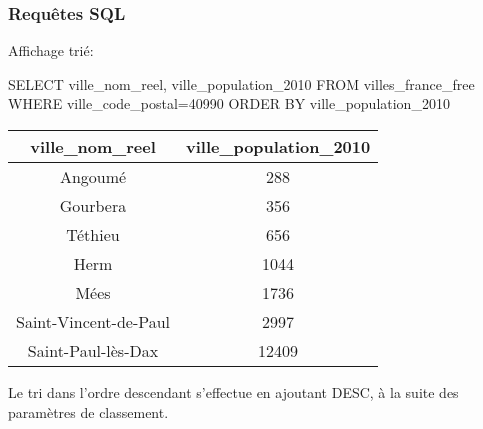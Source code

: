 \begin{frame}[fragile]
\frametitle{Requêtes SQL}

Affichage trié:

\begin{GrayBox}[0.85\textwidth]
\begin{semiverbatim}\small
SELECT ville_nom_reel, ville_population_2010
FROM villes_france_free
WHERE ville_code_postal=40990 ORDER BY ville_population_2010
\end{semiverbatim}
\end{GrayBox}

\begin{center}
\begin{tabular}{|c|c|}
\hline
\textbf{ville\_nom\_reel} & \textbf{ville\_population\_2010} \\
\hline
Angoumé & 288 \\
\hline
Gourbera & 356 \\
\hline
Téthieu & 656 \\
\hline
Herm & 1044 \\
\hline
Mées & 1736 \\
\hline
Saint-Vincent-de-Paul & 2997 \\
\hline
Saint-Paul-lès-Dax & 12409 \\
\hline
\end{tabular}
\end{center}

Le tri dans l'ordre descendant s'effectue en ajoutant DESC, à la suite des paramètres de classement.

\end{frame}

